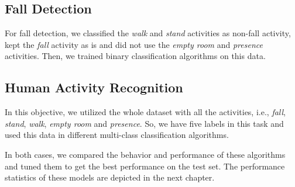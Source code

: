 \subsection{Fall Detection}
For fall detection, we classified the \emph{walk} and \emph{stand} activities as non-fall activity, kept the \emph{fall} activity as is and did not use the \emph{empty room} and \emph{presence} activities. Then, we trained binary classification algorithms on this data.
\subsection{Human Activity Recognition}
In this objective, we utilized the whole dataset with all the activities, i.e., \emph{fall}, \emph{stand}, \emph{walk}, \emph{empty room} and \emph{presence}. So, we have five labels in this task and used this data in different multi-class classification algorithms.

In both cases, we compared the behavior and performance of these algorithms and tuned them to get the best performance on the test set. The performance statistics of these models are depicted in the next chapter.

